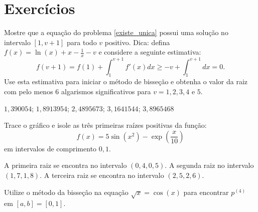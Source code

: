 
\fi

\section*{Exercícios}

\begin{Exercise} Mostre que a equação do problema \ref{existe_unica} possui uma solução no intervalo $[1, v+1]$ para todo $v$ positivo. Dica: defina $f(x)=\ln(x)+x-\frac{1}{x}-v$  e considere a seguinte estimativa:
  \begin{equation*}
    f(v+1)=f(1)+\int_1^{v+1}f'(x)dx\geq -v+\int_1^{v+1}dx=0.  
  \end{equation*}
Use esta estimativa para iniciar o método de bisseção e obtenha o valor da raiz com pelo menos 6 algarismos significativos para $v=1, 2, 3, 4$ e $5$.
\end{Exercise}
\begin{Answer}
  \begin{tiny}
    $1,390054$; $1,8913954$; $2,4895673$; $3,1641544$; $3,8965468$    
  \end{tiny}
\end{Answer}

\begin{Exercise} Trace o gráfico e isole as três primeiras raízes positivas da função:
  \begin{equation*}
    f(x)=5\sin(x^2)-\exp\left({\frac{x}{10}}\right)  
  \end{equation*}
em intervalos de comprimento $0,1$.
\end{Exercise}
\begin{Answer}
  \begin{tiny}
    A primeira raiz se encontra no intervalo $(0,4, 0,5)$. A segunda raiz no intervalo $(1,7, 1,8)$. A terceira raiz se encontra no intervalo $(2,5, 2,6)$.    
  \end{tiny}
\end{Answer}

\begin{Exercise}Utilize o método da bisseção na equação $\sqrt{x}=\cos(x)$ para encontrar $p^{(4)}$ em $[a,b]=[0, 1]$.
\end{Exercise}

